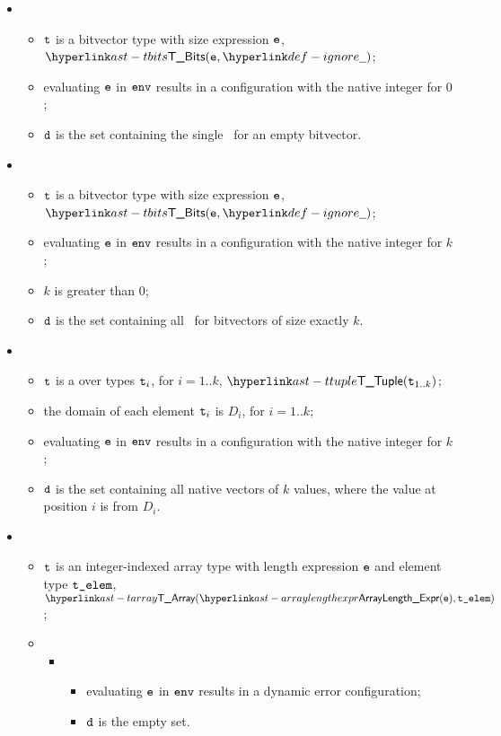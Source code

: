 \begin{itemize}
  \item {}
  \begin{itemize}
    \item $\texttt{t}$ is a bitvector type with size expression $\texttt{e}$, $\TBits(\ve, \Ignore)$;
    \item evaluating $\texttt{e}$ in $\texttt{env}$ results in a configuration with the native integer for $0$;
    \item $\texttt{d}$ is the set containing the single \nativevalue\ for an empty bitvector.
  \end{itemize}

  \item {}
  \begin{itemize}
    \item $\texttt{t}$ is a bitvector type with size expression $\texttt{e}$, $\TBits(\ve, \Ignore)$;
    \item evaluating $\texttt{e}$ in $\texttt{env}$ results in a configuration with the native integer for $k$;
    \item $k$ is greater than $0$;
    \item $\texttt{d}$ is the set containing all \nativevalues\ for bitvectors of size exactly $k$.
  \end{itemize}

  \item {}
  \begin{itemize}
    \item $\texttt{t}$ is a \tupletypeterm{} over types $\texttt{t}_i$, for $i=1..k$, $\TTuple(\vt_{1..k})$;
    \item the domain of each element $\texttt{t}_i$ is $D_i$, for $i=1..k$;
    \item evaluating $\texttt{e}$ in $\texttt{env}$ results in a configuration with the native integer for $k$;
    \item $\texttt{d}$ is the set containing all native vectors of $k$ values, where the value at position $i$
    is from $D_i$.
  \end{itemize}

  \item \AllApply
  \begin{itemize}
    \item $\texttt{t}$ is an integer-indexed array type with length expression $\texttt{e}$ and element type $\texttt{t\_elem}$, $\TArray(\ArrayLengthExpr(\ve), \telem)$;
    \item \OneApplies
      \begin{itemize}
      \item {}
      \begin{itemize}
        \item evaluating $\texttt{e}$ in $\texttt{env}$ results in a dynamic error configuration;
        \item $\texttt{d}$ is the empty set.
      \end{itemize}


\end{itemize}
\end{itemize}
\end{itemize}
